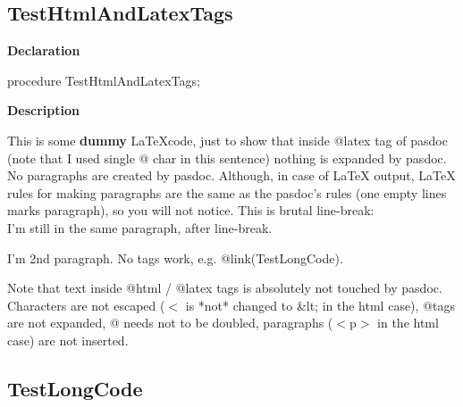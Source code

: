 \documentclass{report}
\newif\ifpdf
\begin{document}
\subsection*{TestHtmlAndLatexTags}
\fi
\label{ok_expanding_descriptions-TestHtmlAndLatexTags}
\begin{list}{}{
\setlength{\itemindent}{0cm}
\setlength{\listparindent}{0cm}
\setlength{\leftmargin}{\evensidemargin}
\addtolength{\leftmargin}{\tmplength}
\settowidth{\labelsep}{X}
\addtolength{\leftmargin}{\labelsep}
\setlength{\labelwidth}{\tmplength}
}
\item[\textbf{Declaration}\hfill]
\ifpdf
\begin{flushleft}
\fi
\begin{ttfamily}
procedure TestHtmlAndLatexTags;\end{ttfamily}

\ifpdf
\end{flushleft}
\fi

\par
\item[\textbf{Description}]



    This is some {\bf dummy} \LaTeX code, just to show that inside
    @latex tag of pasdoc (note that I used single @ char in this sentence)
    nothing is expanded by pasdoc.
    No paragraphs are created by pasdoc. Although, in case of LaTeX output,
    LaTeX rules for making paragraphs are the same as the pasdoc's rules
    (one empty lines marks paragraph), so you will not notice.
    This is brutal line-break: \\
    I'm still in the same paragraph, after line-break.

    I'm 2nd paragraph.
    No tags work, e.g. @link(TestLongCode).
  

Note that text inside @html / @latex tags is absolutely not touched by pasdoc. Characters are not escaped ({$<$} is *not* changed to {\&}lt; in the html case), @tags are not expanded, @ needs not to be doubled, paragraphs ({$<$}p{$>$} in the html case) are not inserted.

\end{list}
\ifpdf
\subsection*{\large{\textbf{TestLongCode}}\normalsize\hspace{1ex}\hrulefill}
\else
\end{document}
